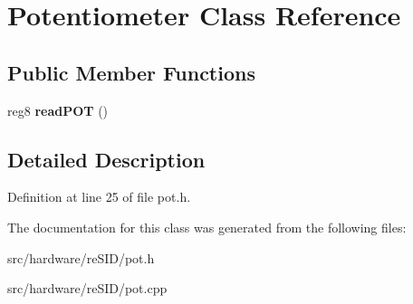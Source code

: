 \hypertarget{classPotentiometer}{\section{Potentiometer Class Reference}
\label{classPotentiometer}
}
\subsection*{Public Member Functions}
\begin{DoxyCompactItemize}
\item 
\hypertarget{classPotentiometer_a1be0a90a64b61137e3e42b916e876339}{reg8 {\bfseries read\-P\-O\-T} ()}\label{classPotentiometer_a1be0a90a64b61137e3e42b916e876339}

\end{DoxyCompactItemize}


\subsection{Detailed Description}


Definition at line 25 of file pot.\-h.



The documentation for this class was generated from the following files\-:\begin{DoxyCompactItemize}
\item 
src/hardware/re\-S\-I\-D/pot.\-h\item 
src/hardware/re\-S\-I\-D/pot.\-cpp\end{DoxyCompactItemize}

